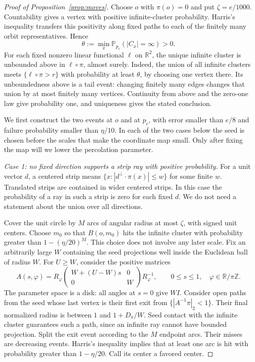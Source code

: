 \documentclass[11pt]{article}
\theoremstyle{definition}
\begin{document}
\begin{proof}[Proof of Proposition~\ref{prop:moves}]
Choose $o$ with $\pi(o)=0$ and put $\zeta=e/1000$.
Countability gives a vertex with positive infinite-cluster probability.
Harris's inequality transfers this positivity along fixed paths to each
of the finitely many orbit representatives. Hence
\[
 \theta:=\min_x\mathbb P_{p_c}(|C_x|=\infty)>0.
\]
For each fixed nonzero linear functional \(\ell\) on \(\mathbb R^2\),
the unique infinite cluster is unbounded above in \(\ell\circ\pi\),
almost surely. Indeed, the union of all infinite clusters meets
\(\{\ell\circ\pi>r\}\) with probability at least \(\theta\), by
choosing one vertex there. Its unboundedness above is a tail event:
changing finitely many edges changes that union by at most finitely
many vertices. Continuity from above and the zero-one law give
probability one, and uniqueness gives the stated conclusion.

We first construct the two events at \(o\) and at \(p_c\), with error
smaller than \(e/8\) and failure probability smaller than \(\eta/10\).
In each of the two cases below the seed is chosen before the scales
that make the coordinate map small. Only after fixing the map will we
lower the percolation parameter.

\emph{Case 1: no fixed direction supports a strip ray with positive
probability.} For a unit vector $d$, a centered strip means
$\{x:|d^\perp\cdot\pi(x)|\le w\}$ for some finite $w$. Translated
strips are contained in wider centered strips. In this case the
probability of a ray in such a strip is zero for each fixed $d$.
We do not need a statement about the union over all directions.

Cover the unit circle by $M$ arcs of angular radius at most $\zeta$,
with signed unit centers. Choose $m_0$ so that $B(o,m_0)$ hits the
infinite cluster with probability greater than $1-(\eta/20)^M$.
This choice does not involve any later scale. Fix an arbitrarily large
$W$ containing the seed projections well inside the Euclidean ball of
radius $W$. For $U\ge W$, consider the positive matrices
\[
 A(s,\varphi)=R_\varphi
       \begin{pmatrix}W+(U-W)s&0\\0&W\end{pmatrix}R_\varphi^{-1},
 \qquad 0\le s\le1,\quad\varphi\in\mathbb R/\pi\mathbb Z.
\]
The parameter space is a disk: all angles at $s=0$ give $W I$.
Consider open paths from the seed whose last vertex is their first
exit from $\{|A^{-1}\pi|_2<1\}$. Their final normalized radius is
between $1$ and $1+D_\pi/W$. Seed contact with the infinite cluster
guarantees such a path, since an infinite ray cannot have bounded
projection. Split the exit event according to the $M$ endpoint arcs.
Their misses are decreasing events. Harris's inequality implies that
at least one arc is hit with probability greater than $1-\eta/20$.
Call its center a favored center.


\end{proof}
\end{document}
